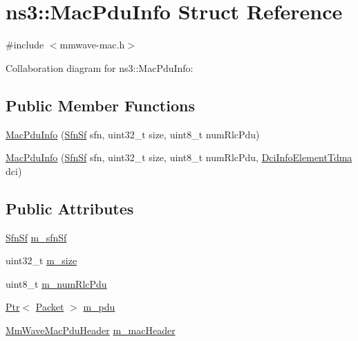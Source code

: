 \hypertarget{structns3_1_1MacPduInfo}{}\section{ns3\+:\+:Mac\+Pdu\+Info Struct Reference}
\label{structns3_1_1MacPduInfo}


{\ttfamily \#include $<$mmwave-\/mac.\+h$>$}



Collaboration diagram for ns3\+:\+:Mac\+Pdu\+Info\+:
\subsection*{Public Member Functions}
\begin{DoxyCompactItemize}
\item 
\hyperlink{structns3_1_1MacPduInfo_a44caed325ccfe2ceee36b4ff2c81ba7d}{Mac\+Pdu\+Info} (\hyperlink{structns3_1_1SfnSf}{Sfn\+Sf} sfn, uint32\+\_\+t size, uint8\+\_\+t num\+Rlc\+Pdu)
\item 
\hyperlink{structns3_1_1MacPduInfo_ae7aadd93f6ff19275d895394672fbed0}{Mac\+Pdu\+Info} (\hyperlink{structns3_1_1SfnSf}{Sfn\+Sf} sfn, uint32\+\_\+t size, uint8\+\_\+t num\+Rlc\+Pdu, \hyperlink{structns3_1_1DciInfoElementTdma}{Dci\+Info\+Element\+Tdma} dci)
\end{DoxyCompactItemize}
\subsection*{Public Attributes}
\begin{DoxyCompactItemize}
\item 
\hyperlink{structns3_1_1SfnSf}{Sfn\+Sf} \hyperlink{structns3_1_1MacPduInfo_ab4a384a3ad7656d97a44dac15f999dc3}{m\+\_\+sfn\+Sf}
\item 
uint32\+\_\+t \hyperlink{structns3_1_1MacPduInfo_a5edfc030dcb999c430d7bde249b78003}{m\+\_\+size}
\item 
uint8\+\_\+t \hyperlink{structns3_1_1MacPduInfo_a03b7567bfc0fee0e8b90c799a9ac142f}{m\+\_\+num\+Rlc\+Pdu}
\item 
\hyperlink{classns3_1_1Ptr}{Ptr}$<$ \hyperlink{classns3_1_1Packet}{Packet} $>$ \hyperlink{structns3_1_1MacPduInfo_a6f25302a0457bf937e74bad820b90304}{m\+\_\+pdu}
\item 
\hyperlink{classns3_1_1MmWaveMacPduHeader}{Mm\+Wave\+Mac\+Pdu\+Header} \hyperlink{structns3_1_1MacPduInfo_ae337e900ffaeee57e5ab6d5d89cb2842}{m\+\_\+mac\+Header}
\end{DoxyCompactItemize}


